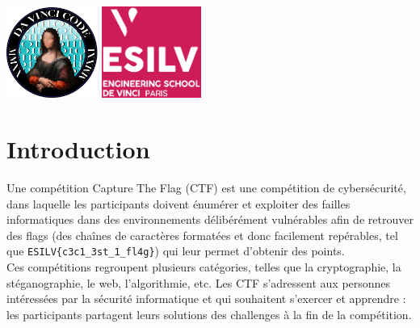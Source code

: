 \documentclass[12pt]{article}
\begin{document}
    \backgroundpages
    \setlength{\columnsep}{-1cm}
    \begin{multicols}{2}\raggedbottom\color{white}
        \noindent
        \parbox[t][40mm][t]{\columnwidth}{\setlength{\parindent}{1em}
        \vspace*{-18mm}
        \includegraphics[height=30mm]{davincicode}
        \includegraphics[height=30mm]{esilv}
        }

        \noindent
        \parbox[c][40mm][c]{\columnwidth}{\setlength{\parindent}{0em}
        \shadowoffsetx{1pt}
        \shadowoffsety{0pt}
        \vspace*{-24mm}
        \vspace{0.5cm}
        }

    \end{multicols}
    \vspace*{-30mm}
    \raggedbottom
    \section{Introduction}

    Une compétition Capture The Flag (CTF) est une compétition de cybersécurité, dans laquelle les participants doivent énumérer et exploiter des failles informatiques dans des environnements délibérément vulnérables afin de retrouver des flags (des chaînes de caractères formatées et donc facilement repérables, tel que \verb+ESILV{c3c1_3st_1_fl4g}+) qui leur permet d’obtenir des points.\\ 
    Ces compétitions regroupent plusieurs catégories, telles que la cryptographie, la stéganographie, le web, l’algorithmie, etc.
    Les CTF s’adressent aux personnes intéressées par la sécurité informatique et qui souhaitent s’exercer et apprendre : les participants partagent leurs solutions des challenges à la fin de la compétition.
\end{document}
